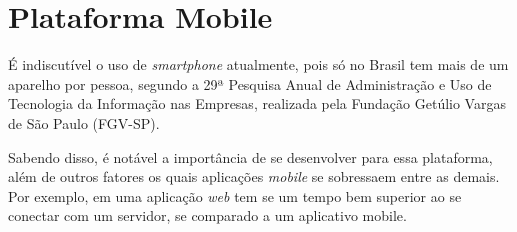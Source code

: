 \section{Plataforma Mobile}
É indiscutível o uso de \textit{smartphone} atualmente, pois só no Brasil tem mais de um aparelho por pessoa, segundo a 29ª Pesquisa Anual de Administração e Uso de Tecnologia da Informação nas Empresas, realizada pela Fundação Getúlio Vargas de São Paulo (FGV-SP).

Sabendo disso, é notável a importância de se desenvolver para essa plataforma, além de outros fatores os quais aplicações \textit{mobile} se sobressaem entre as demais. Por exemplo, em uma aplicação \textit{web} tem se um tempo bem superior ao se conectar com um servidor, se comparado a um aplicativo mobile.
\cite{meirellespesquisa29}
